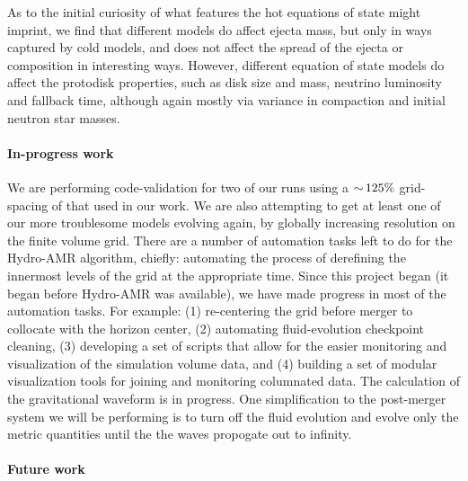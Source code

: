 As to the initial curiosity of what features the hot equations of state might imprint, we find that different models do affect ejecta mass, but only in ways captured by cold models, and does not affect the spread of the ejecta or composition in interesting ways.
However, different equation of state models do affect the protodisk properties, such as disk size and mass, neutrino luminosity and fallback time, although again mostly via variance in compaction and initial neutron star masses.
 

\paragraph{In-progress work}

We are performing code-validation for two of our runs using a $\mathord{\sim}\,125\%$ grid-spacing of that used in our work.
We are also attempting to get at least one of our more troublesome models evolving again, by globally increasing resolution on the finite volume grid.
There are a number of automation tasks left to do for the Hydro-AMR algorithm, chiefly: automating the process of derefining the innermost levels of the grid at the appropriate time.
Since this project began (it began before Hydro-AMR was available), we have made progress in most of the automation tasks. For example:
(1) re-centering the grid before merger to collocate with the horizon center, 
(2) automating fluid-evolution checkpoint cleaning, 
(3) developing a set of scripts that allow for the easier monitoring and visualization of the simulation volume data, 
and (4) building a set of modular visualization tools for joining and monitoring columnated data.
The calculation of the gravitational waveform is in progress.
One simplification to the post-merger system we will be performing is to turn off the fluid evolution and evolve only the metric quantities until the the waves propogate out to infinity.

\paragraph{Future work} 

